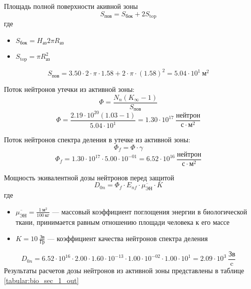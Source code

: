 \noindent Площадь полной поверхности акивной зоны
\begin{equation}
        S_{\text{пов}} = S_{\text{бок}} + 2S_{\text{top}}
\end{equation}
\noindent где
\begin{itemize}
        \item $S_\text{бок} = H_{\text{аз}}2 \pi R_{\text{аз}}$
        \item $S_{\text{top}} = \pi R_{\text{аз}} ^ 2$
\end{itemize}
$$
        S_{\text{пов}} = 3.50  \cdot 2 \cdot \pi \cdot 1.58  + 2 \cdot \pi \cdot (1.58 )^2 = 5.04 \cdot 10^{{ 1 }}\ \text{м}^2
$$

\noindent Поток нейтронов утечки из активной зоны:
\begin{equation}
        \Phi = \frac
                   {N_n(K_\infty - 1)}
                   {S_{\text{пов}}}
\end{equation}
$$
        \Phi = \frac{2.19 \cdot 10^{{ 20 }} (1.03  - 1)} {5.04 \cdot 10^{{ 1 }}} = 1.30 \cdot 10^{{ 17 }}\ \frac{\text{нейтрон}}{\text{с} \cdot \text{м}^2}
$$

\noindent Поток нейтронов спектра деления в утечке из активной зоны:
\begin{equation}
        \Phi_f = \Phi \cdot \gamma
\end{equation}
$$
        \Phi_f = 1.30 \cdot 10^{{ 17 }} \cdot 5.00 \cdot 10^{{ -01 }} = 6.52 \cdot 10^{{ 16 }}\ \frac{\text{нейтрон}} {\text{с} \cdot \text{м}^2}
$$

\noindent Мощность экивалентной дозы нейтронов перед защитой
\begin{equation}
        D_{0n} = \Phi_f \cdot E_{nf} \cdot \overline{\mu_{\text{ЭН}}} \cdot K 
\end{equation}
\noindent где
\begin{itemize}
        \item $\overline{\mu_{\text{ЭН}}} = \frac {1\ \text{м}^2} {100\ \text{кг}}$ — массовый коэффициент поглощения энергии в биологической ткани, принимается равным отношению площади человека к его массе
        \item $K = 10\ \frac {\text{Зв}}{\text{Гр}}$ — коэффициент качества нейтронов спектра деления
\end{itemize}
$$
        D_{0n} = 6.52 \cdot 10^{{ 16 }} \cdot 2.00  \cdot 1.60 \cdot 10^{{ -13 }} \cdot 1.00 \cdot 10^{{ -02 }} \cdot 1.00 \cdot 10^{{ 1 }} = 2.09 \cdot 10^{{ 3 }}\ \frac{\text{Зв}}{\text{c}}
$$
Результаты расчетов дозы нейтронов из активной зоны представлены в таблице \ref{tabular:bio_sec_1_out}

